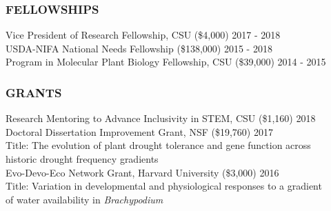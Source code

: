 \documentclass[12pt,english]{article}
\begin{document}
\subsubsection*{FELLOWSHIPS}
\vspace{-0.5ex}
\hspace*{1.0em} Vice President of Research Fellowship, CSU (\$4,000)
\hfill
2017 - 2018
\vspace{1ex}\\
\hspace*{1.0em} USDA-NIFA National Needs Fellowship (\$138,000)
\hfill
2015 - 2018
\vspace{1ex}\\
\hspace*{1.0em} Program in Molecular Plant Biology Fellowship, CSU (\$39,000)
\hfill
2014 - 2015
\vspace{1ex}



\subsubsection*{GRANTS}
\vspace{-0.5ex}
\hspace*{1.0em} Research Mentoring to Advance Inclusivity in STEM, CSU (\$1,160)
\hfill
2018\vspace{1ex}\\
\hspace*{1.0em} Doctoral Dissertation Improvement Grant, NSF (\$19,760)
\hfill
2017\\
\hspace*{2.0em} Title: The evolution of plant drought tolerance and gene function across\\
\hspace*{2.0em} historic drought frequency gradients
\vspace{1ex}\\
\hspace*{1.0em} Evo-Devo-Eco Network Grant, Harvard University (\$3,000)
\hfill
2016\\
\hspace*{2.0em} Title: Variation  in  developmental  and  physiological  responses  to  a  gradient\\ \hspace*{2.0em} of water availability in \textit{Brachypodium}
\vspace{1ex}

\end{document}
